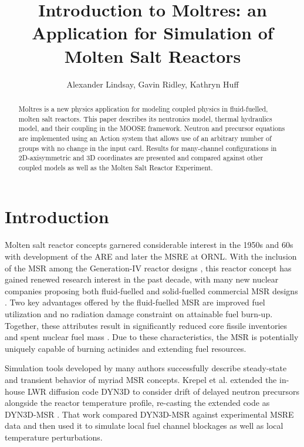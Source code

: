 \documentclass{article}
\title{Introduction to Moltres: an Application for Simulation of Molten Salt Reactors}
\author{Alexander Lindsay, Gavin Ridley, Kathryn Huff}
\let\Oldsection\section
\renewcommand{\section}{\FloatBarrier\Oldsection}
\begin{document}
\maketitle

\begin{abstract}

Moltres is a new physics application for modeling coupled physics in 
fluid-fuelled, molten salt reactors. This paper describes its neutronics model, 
thermal hydraulics model, and their coupling in the MOOSE framework. Neutron 
and precursor equations are implemented using an Action system that allows use 
of an arbitrary number of groups with no change in the input card. Results for 
many-channel configurations in 2D-axisymmetric and 3D coordinates are presented 
and compared against other coupled models as well as the Molten Salt Reactor 
Experiment.

\end{abstract}

\section{Introduction}

Molten salt reactor concepts garnered considerable interest in the 1950s and 60s
with development of the \gls{ARE} and later the \gls{MSRE} at \gls{ORNL}.  With
the inclusion of the \gls{MSR} among the Generation-IV reactor designs
\cite{gif_generation_2008,gif_generation_2015}, this reactor concept has gained renewed research
interest in the past decade, with many new nuclear companies proposing both
fluid-fuelled and solid-fuelled commercial \gls{MSR} designs
\cite{hyde_liquid_2015,leblanc_integral_2015,thorcon_-able_2017,scarlat_design_2014,transatomic_power_corporation_neutronics_2016}. 
Two key advantages offered by the fluid-fuelled \gls{MSR} are improved fuel
utilization and no radiation damage constraint on attainable fuel
burn-up. Together, these attributes result in significantly reduced core fissile
inventories and spent nuclear fuel mass 
\cite{gif_generation_2008,gif_generation_2015}.  
Due to these characteristics, the \gls{MSR} is potentially uniquely capable of 
burning actinides and extending fuel resources.

Simulation tools developed by many authors successfully describe steady-state and
transient behavior of myriad \gls{MSR} concepts. Krepel et al. extended the in-house \gls{LWR}
diffusion code DYN3D to consider drift of delayed neutron precursors alongside
the reactor temperature profile, re-casting the extended code as
DYN3D-MSR \cite{krepel_dyn3d-msr_2007}. That work compared DYN3D-MSR against
experimental \gls{MSRE} data and then used it to simulate local fuel channel
blockages as well as local temperature perturbations. 
\end{document}
